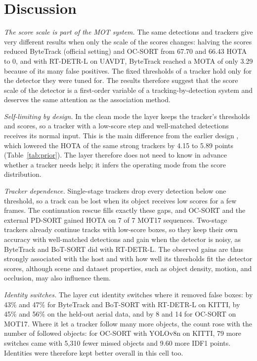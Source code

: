 \section{Discussion}\label{sec:discussion}

\emph{The score scale is part of the MOT system.} The same detections and trackers give very
different results when only the scale of the scores changes: halving the scores reduced ByteTrack
(official setting) and OC-SORT from 67.70 and 66.43 HOTA to 0, and with RT-DETR-L on UAVDT, ByteTrack
reached a MOTA of only 3.29 because of its many false positives. The fixed thresholds of a tracker
hold only for the detector they were tuned for. The results therefore suggest that the score scale
of the detector is a first-order variable of a tracking-by-detection system and deserves the same
attention as the association method.

\emph{Self-limiting by design.} In the clean mode the layer keeps the tracker's thresholds and
scores, so a tracker with a low-score step and well-matched detections receives its normal input.
This is the main difference from the earlier design \aob{}, which lowered the HOTA of the same
strong trackers by 4.15 to 5.89 points (Table~\ref{tab:prior}). The layer therefore does not need
to know in advance whether a tracker needs help; it infers the operating mode from the score
distribution.

\emph{Tracker dependence.} Single-stage trackers drop every detection below one threshold, so a
track can be lost when its object receives low scores for a few frames. The continuation rescue
fills exactly these gaps, and OC-SORT and the external PD-SORT gained HOTA on 7 of 7 MOT17 sequences.
Two-stage trackers already continue tracks with low-score boxes, so they keep their own accuracy
with well-matched detections and gain when the detector is noisy, as ByteTrack and BoT-SORT did with
RT-DETR-L. The observed gains are thus strongly associated with the host and with how well its
thresholds fit the detector scores, although scene and dataset properties, such as object density,
motion, and occlusion, may also influence them.

\emph{Identity switches.} The layer cut identity switches where it removed false boxes: by 43\% and
47\% for ByteTrack and BoT-SORT with RT-DETR-L on KITTI, by 45\% and 56\% on the held-out aerial
data, and by 8 and 14 for OC-SORT on MOT17. Where it let a tracker follow many more objects, the
count rose with the number of followed objects: for OC-SORT with YOLOv8n on KITTI, 79 more switches
came with 5,310 fewer missed objects and 9.60 more IDF1 points. Identities were therefore kept
better overall in this cell too.

